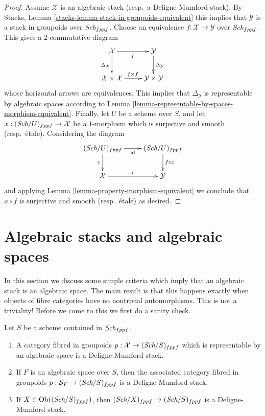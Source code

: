 \begin{proof}
Assume $\mathcal{X}$ is an algebraic stack (resp.\ a Deligne-Mumford stack). By
Stacks, Lemma \ref{stacks-lemma-stack-in-groupoids-equivalent}
this implies that $\mathcal{Y}$ is a stack in groupoids over
$\textit{Sch}_{fppf}$. Choose an equivalence $f : \mathcal{X} \to \mathcal{Y}$
over $\textit{Sch}_{fppf}$. This gives a $2$-commutative diagram
$$
\xymatrix{
\mathcal{X} \ar[r]_f \ar[d]_{\Delta_\mathcal{X}} &
\mathcal{Y} \ar[d]^{\Delta_\mathcal{Y}} \\
\mathcal{X} \times \mathcal{X} \ar[r]^{f \times f} &
\mathcal{Y} \times \mathcal{Y}
}
$$
whose horizontal arrows are equivalences. This implies that
$\Delta_\mathcal{Y}$ is representable by algebraic spaces according to
Lemma \ref{lemma-representable-by-spaces-morphism-equivalent}.
Finally, let $U$ be a scheme over $S$, and let
$x : (\textit{Sch}/U)_{fppf} \to \mathcal{X}$ be a $1$-morphism which
is surjective and smooth (resp.\ \'etale). Considering the diagram
$$
\xymatrix{
(\Sch/U)_{fppf} \ar[r]_{\text{id}} \ar[d]_{x} &
(\Sch/U)_{fppf} \ar[d]^{f \circ x} \\
\mathcal{X} \ar[r]^f &
\mathcal{Y}
}
$$
and applying
Lemma \ref{lemma-property-morphism-equivalent}
we conclude that $x \circ f$ is surjective and smooth (resp.\ \'etale)
as desired.
\end{proof}




\section{Algebraic stacks and algebraic spaces}
\label{section-stacks-spaces}

\noindent
In this section we discuss some simple criteria which imply that an
algebraic stack is an algebraic space. The main result is that this
happens exactly when objects of fibre categories have no nontrivial
automorphisms. This is not a triviality! Before we come to this
we first do a sanity check.

\begin{lemma}
\label{lemma-representable-algebraic}
Let $S$ be a scheme contained in $\textit{Sch}_{fppf}$.
\begin{enumerate}
\item A category fibred in groupoids
$p : \mathcal{X} \to (\textit{Sch}/S)_{fppf}$
which is representable by an algebraic space is a Deligne-Mumford stack.
\item If $F$ is an algebraic space over $S$, then the associated
category fibred in groupoids
$p : \mathcal{S}_F \to (\textit{Sch}/S)_{fppf}$
is a Deligne-Mumford stack.
\item If $X \in \text{Ob}((\textit{Sch}/S)_{fppf})$, then
$(\textit{Sch}/X)_{fppf} \to (\textit{Sch}/S)_{fppf}$ is
a Deligne-Mumford stack.
\end{enumerate}
\end{lemma}

